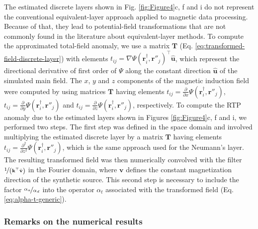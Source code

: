 The estimated discrete layers shown in Fig. \ref{fig:Figure4}c, f and i do not represent the conventional 
equivalent-layer approach applied to magnetic data processing.
Because of that, they lead to potential-field transformations that are not commonly 
found in the literature about equivalent-layer methods.
To compute the approximated total-field anomaly, we use a matrix $\mathbf{T}$ (Eq. \ref{eq:transformed-field-discrete-layer}) 
with elements $t_{ij} = \nabla \Psi(\mathbf{r}^{\dagger}_{i}, \mathbf{r}''_{j})^{\top} \hat{\mathbf{u}}$, 
which represent the directional derivative of first order of $\Psi$ along the constant direction $\hat{\mathbf{u}}$ 
of the simulated main field.
The $x$, $y$ and $z$ components of the magnetic induction field were computed by using matrices $\mathbf{T}$
having elements $t_{ij} = \tfrac{\partial}{\partial x} \Psi(\mathbf{r}^{\dagger}_{i}, \mathbf{r}''_{j})$, 
$t_{ij} = \tfrac{\partial}{\partial y} \Psi(\mathbf{r}^{\dagger}_{i}, \mathbf{r}''_{j})$ and 
$t_{ij} = \tfrac{\partial}{\partial z} \Psi(\mathbf{r}^{\dagger}_{i}, \mathbf{r}''_{j})$, respectively.
To compute the RTP anomaly due to the estimated layers shown in Figures \ref{fig:Figure4}c, f and i, we performed two steps. 
The first step was defined in the space domain and involved multiplying the estimated discrete layer 
by a matrix $\mathbf{T}$ 
having elements $t_{ij} = \tfrac{\partial^{2}}{\partial z^{2}} \Psi(\mathbf{r}^{\dagger}_{i}, \mathbf{r}''_{j})$,
which is the same approach used for the Neumann's layer. 
The resulting transformed field was then numerically convolved with the filter $\nicefrac{1}{\left(\mathbf{k}^{\top} \hat{\mathbf{v}} \right)}$ 
in the Fourier domain, where $\mathbf{v}$ defines the constant magnetization direction of the synthetic source.
This second step is necessary to include the factor $\nicefrac{\alpha_{a}}{\alpha_{d}}$ into the operator 
$\alpha_{t}$ associated with the transformed field (Eq. \ref{eq:alpha-t-generic}).

\subsubsection{Remarks on the numerical results}

